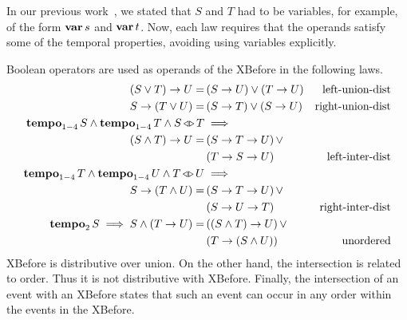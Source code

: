 \documentclass[12pt,openright,twoside,a4paper,oldfontcommands,english,brazil,final]{abntex2}
\theoremstyle{theo}
\def\varop{\ensuremath\operatorname{\mathbf{var}}}
\newcommand{\var}[1]{\ensuremath\varop #1}
\def\xbeforeop{\ensuremath\rightarrow}
\newcommand{\xbefore}[2]{\ensuremath #1 \xbeforeop #2 }
\def\tempoop{\ensuremath\operatorname{\mathbf{tempo}}}
\newcommand{\tempo}[2][1-4]{\ensuremath\tempoop_{#1} #2}
\def\independenteventsop{\ensuremath\operatorname{\triangleleft\triangleright}}
\newcommand{\independentevents}[2]{\ensuremath #1 \independenteventsop #2}
\newcommand{\parsin}[1]{\ensuremath\left( #1 \right)}
\begin{document}
In our previous work~\cite{DM2015}, we stated that $S$ and $T$ had to be variables, for example, of the form $\var{s}$ and $\var{t}$.
Now, each law requires that the operands satisfy some of the temporal properties, avoiding using variables explicitly.

Boolean operators are used as operands of the \ac{XBefore} in the following laws.
%
\begin{subequations}
\begin{align}
\xbefore{\left(S \lor T\right)}{U} =&
  \parsin{\xbefore{S}{U}} \lor \parsin{\xbefore{T}{U}} &
  \text{left-union-dist}
  \label{thm:xbefore-sup-1}\\
%
\xbefore{S}{\left(T \lor U\right)} =&
  \parsin{\xbefore{S}{T}} \lor \parsin{\xbefore{S}{U}} &
  \text{right-union-dist}
  \label{thm:xbefore-sup-2}\\
%
\tempo{S} \land \tempo{T} \land \independentevents{S}{T} & \implies\nonumber \\
  \xbefore{\left(S \land T\right)}{U} =&
  \parsin{\xbefore{\xbefore{S}{T}}{U}} \lor \nonumber\\
  &\parsin{\xbefore{\xbefore{T}{S}}{U}} &
  \text{left-inter-dist}
  \label{thm:xbefore-inf-1}\\
%
\tempo{T} \land \tempo{U} \land \independentevents{T}{U} & \implies \nonumber\\
  \xbefore{S}{\left(T \land U\right)} =&
  \parsin{\xbefore{S}{\xbefore{T}{U}}} \lor \nonumber\\
  &\parsin{\xbefore{S}{\xbefore{U}{T}}} &
  \text{right-inter-dist}
  \label{thm:xbefore-inf-2}\\
%
\tempo[2]{S} \implies S \land \parsin{\xbefore{T}{U}} =&
  \parsin{\xbefore{\parsin{S \land T}}{U}} \lor \nonumber\\
  &\parsin{\xbefore{T}{\parsin{S \land U}}} &
  \text{unordered}
  \label{thm:and_xbefore_equiv_or_xbefore}
\end{align}
\end{subequations}
%
\ac{XBefore} is distributive over union.
On the other hand, the intersection is related to order.
Thus it is not distributive with \ac{XBefore}.
Finally, the intersection of an event with an \ac{XBefore} states that such an event can occur in any order within the events in the \ac{XBefore}.
\end{document}
